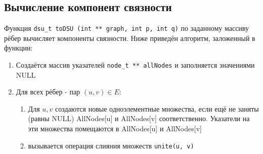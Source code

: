 \documentclass[zuev-report.tex]{subfiles}
\begin{document}
\subsection{Вычисление компонент связности}
Функция \lstinline|dsu_t toDSU (int ** graph, int p, int q)| по заданному массиву рёбер вычисляет компоненты связности. Ниже приведён алгоритм, заложенный в функции:
\begin{enumerate}
	\item Создаётся массив указателей \lstinline|node_t ** allNodes| и заполняется значениями NULL
	\item Для всех рёбер - пар $(u,v) \in E$:
	\begin{enumerate}
		\item Для $u, v$ создаются новые одноэлементные множества, если ещё не заняты (равны NULL) AllNodes[u] и AllNodes[v] соответственно. Указатели на эти множества помещаются в AllNodes[u] и AllNodes[v]
		\item вызывается операция слияния множеств \lstinline|unite(u, v)| 
	\end{enumerate}
\end{enumerate}
\end{document}
